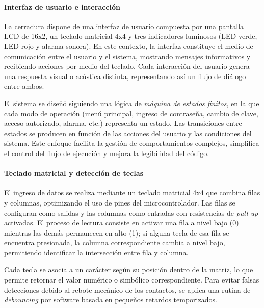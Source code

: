 \vspace{1em}

\paragraph*{Interfaz de usuario e interacción}

La cerradura dispone de una interfaz de usuario compuesta por una pantalla LCD de 16x2, un teclado matricial 4x4 y tres indicadores luminosos (LED verde, LED rojo y alarma sonora). En este contexto, la interfaz constituye el medio de comunicación entre el usuario y el sistema, mostrando mensajes informativos y recibiendo acciones por medio del teclado. Cada interacción del usuario genera una respuesta visual o acústica distinta, representando así un flujo de diálogo entre ambos.

El sistema se diseñó siguiendo una lógica de \textit{máquina de estados finitos}, en la que cada modo de operación (menú principal, ingreso de contraseña, cambio de clave, acceso autorizado, alarma, etc.) representa un estado. Las transiciones entre estados se producen en función de las acciones del usuario y las condiciones del sistema. Este enfoque facilita la gestión de comportamientos complejos, simplifica el control del flujo de ejecución y mejora la legibilidad del código.

\vspace{1em}

\paragraph*{Teclado matricial y detección de teclas}

El ingreso de datos se realiza mediante un teclado matricial 4x4 que combina filas y columnas, optimizando el uso de pines del microcontrolador. Las filas se configuran como salidas y las columnas como entradas con resistencias de \textit{pull-up} activadas. El proceso de lectura consiste en activar una fila a nivel bajo (0) mientras las demás permanecen en alto (1); si alguna tecla de esa fila se encuentra presionada, la columna correspondiente cambia a nivel bajo, permitiendo identificar la intersección entre fila y columna.  

Cada tecla se asocia a un carácter según su posición dentro de la matriz, lo que permite retornar el valor numérico o simbólico correspondiente. Para evitar falsas detecciones debido al rebote mecánico de los contactos, se aplica una rutina de \textit{debouncing} por software basada en pequeños retardos temporizados.

